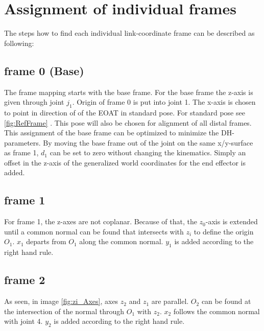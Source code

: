 \chapter{Assignment of individual frames} 
\label{app:IndFrameAss}

The steps how to find each individual link-coordinate frame can be described as following:

\section{frame 0 (Base)}
The frame mapping starts with the base frame. For the base frame the z-axis is given through joint $j_1$. Origin of frame 0 is put into joint 1.
The x-axis is chosen to point in direction of of the \ac{EOAT} in standard pose. For standard pose see 
\ref{fig:RefFrame}
.
This pose will also be chosen for alignment of all distal frames.
\\
This assignment of the base frame can be optimized to minimize the \ac{DH}-parameters. By moving the base frame out of the joint on the same x/y-surface as frame 1, $d_1$ can be set to zero without changing the kinematics. Simply an offset in the z-axis of the generalized world coordinates for the end effector is added.


\section{frame 1}
For frame 1, the z-axes are not coplanar. 
Because of that, the  $z_0$-axis is extended until a common normal can be found that intersects with $z_i$ to define the origin $O_1$.
$x_1$ departs from $O_1$ along the common normal.
$y_1$ is added according to the right hand rule.

\section{frame 2}
As seen, in image \ref{fig:zi_Axes}, axes $z_2$ and $z_1$ are parallel. $O_2$ can be found at the intersection of the normal through $O_1$ with $z_2$. $x_2$ follows the common normal with joint 4.
$y_2$ is added according to the right hand rule.

